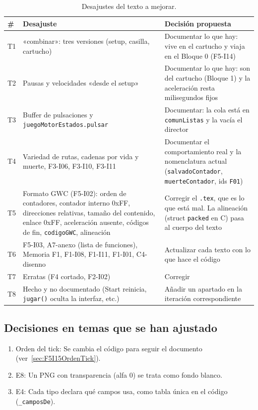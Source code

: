 \begin{table}[H]
	\centering
	\begin{tabularx}{\textwidth}{l >{\RaggedRight\arraybackslash}X >{\RaggedRight\arraybackslash}X}
		\toprule
		\textbf{\#} & \textbf{Desajuste} & \textbf{Decisión propuesta} \\
		\midrule
		
		T1 & «combinar»: tres versiones (setup, casilla, cartucho) & Documentar lo que hay: vive en el cartucho y viaja en el Bloque 0 (F5-I14) \\
		T2 & Pausas y velocidades «desde el setup» & Documentar lo que hay: son del cartucho (Bloque 1) y la aceleración resta milisegundos fijos \\
		T3 & Buffer de pulsaciones y \texttt{juegoMotorEstados.pulsar} & Documentar: la cola está en \texttt{comunListas} y la vacía el director \\
		T4 & Variedad de rutas, cadenas por vida y muerte, F3-I06, F3-I10, F3-I11 & Documentar el comportamiento real y la nomenclatura actual (\texttt{salvadoContador}, \texttt{muerteContador}, ids \texttt{F01}) \\
		T5 & Formato GWC (F5-I02): orden de contadores, contador interno 0xFF, direcciones relativas, tamaño del contenido, enlace 0xFF, aceleración ausente, códigos de fin, \texttt{codigoGWC}, alineación & Corregir el \texttt{.tex}, que es lo que está mal. La alineación (struct \texttt{packed} en C) pasa al cuerpo del texto \\
		T6 & F5-I03, A7-anexo (lista de funciones), Memoria F1, F1-I08, F1-I11, F1-I01, C4-disenno & Actualizar cada texto con lo que hace el código \\
		T7 & Erratas (F4 cortado, F2-I02) & Corregir \\
		T8 & Hecho y no documentado (Start reinicia, \texttt{jugar()} oculta la interfaz, etc.) & Añadir un apartado en la iteración correspondiente \\
		\bottomrule
	\end{tabularx}
	\caption{Desajustes del texto a mejorar.}
\end{table}

\subsection{Decisiones en temas que se han ajustado}
\label{sec:F5I15Decisiones}

\begin{enumerate}
	\item Orden del tick: Se cambia el código para seguir el documento  (ver~\ref{sec:F5I15OrdenTick}).
	\item E8: Un PNG con transparencia (alfa 0) se trata como fondo blanco.
	\item E4: Cada tipo declara qué campos usa, como tabla única en el código (\texttt{\_camposDe}).
\end{enumerate}

